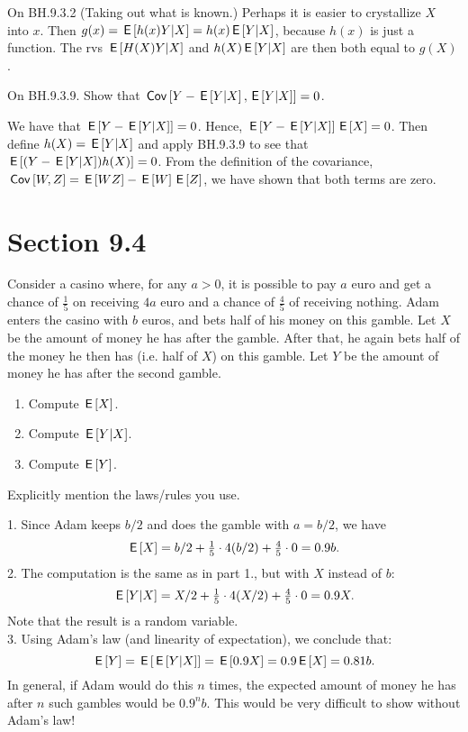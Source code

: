 \begin{remark}
On BH.9.3.2 (Taking out what is known.) Perhaps it is easier to crystallize  $X$ into $x$. Then $g(x) = \,\mathsf{E}\left[h(x) Y|X\right] = h(x) \,\mathsf{E}\left[Y|X\right]$, because $h(x)$ is just a function. The rvs $\,\mathsf{E}\left[H(X) Y|X\right]$ and $h(X) \,\mathsf{E}\left[Y|X\right]$ are then both  equal to $g(X)$.
\end{remark}

\begin{exercise}
On BH.9.3.9. Show that $\,\mathsf{Cov}\left[Y-\,\mathsf{E}\left[Y|X\right], \,\mathsf{E}\left[Y|X\right]\right]=0$.
\begin{solution}
We have that $\,\mathsf{E}\left[Y-\,\mathsf{E}\left[Y|X\right]\right]=0$. Hence, $\,\mathsf{E}\left[Y-\,\mathsf{E}\left[Y|X\right]\right]\,\mathsf{E}\left[X\right] = 0$. Then define $h(X) = \,\mathsf{E}\left[Y|X\right]$ and apply BH.9.3.9 to see that $\,\mathsf{E}\left[(Y-\,\mathsf{E}\left[Y|X\right])h(X)\right] = 0$. From the definition of the covariance, $\,\mathsf{Cov}\left[W, Z\right] = \,\mathsf{E}\left[WZ\right] - \,\mathsf{E}\left[W\right] \,\mathsf{E}\left[Z\right]$, we have shown that both terms are zero.
\end{solution}
\end{exercise}


\section{Section 9.4}
\label{sec:section-9.4}


\begin{exercise}
Consider a casino where, for any $a>0$, it is possible to pay $a$ euro and get a chance of $\tfrac15$ on receiving $4a$ euro and a chance of $\tfrac45$ of receiving nothing.
Adam enters the casino with $b$ euros, and bets half of his money on this gamble.
Let $X$ be the amount of money he has after the gamble.
After that, he again bets half of the money he then has (i.e.
half of $X$) on this gamble.
Let $Y$ be the amount of money he has after the second gamble.
\begin{enumerate}
\item Compute $\,\mathsf{E}\left[X\right]$.
\item Compute $\,\mathsf{E}\left[Y|X\right]$.
\item Compute $\,\mathsf{E}\left[Y\right]$.
\end{enumerate}
Explicitly mention the laws/rules you use.
\begin{solution}

1. Since Adam keeps $b/2$ and does the gamble with $a = b/2$, we have
\begin{equation*}
\,\mathsf{E}\left[X\right] = b/2 + \tfrac15 \cdot 4(b/2) + \tfrac45 \cdot 0 = 0.9 b.
\end{equation*}
2. The computation is the same as in part 1., but with $X$ instead of $b$:
\begin{equation*}
\,\mathsf{E}\left[Y|X\right] = X/2 + \tfrac15 \cdot 4(X/2) + \tfrac45 \cdot 0 = 0.9 X.
\end{equation*}
Note that the result is a random variable. \\
3. Using Adam's law (and linearity of expectation), we conclude that:
\begin{equation*}
\,\mathsf{E}\left[Y\right] = \,\mathsf{E}\left[\,\mathsf{E}\left[Y|X\right]\right] = \,\mathsf{E}\left[0.9X\right] = 0.9\,\mathsf{E}\left[X\right] = 0.81b.
\end{equation*}
In general, if Adam would do this $n$ times, the expected amount of money he has after $n$ such gambles would be $0.9^n b$. This would be very difficult to show without Adam's law!
\end{solution}
\end{exercise}


